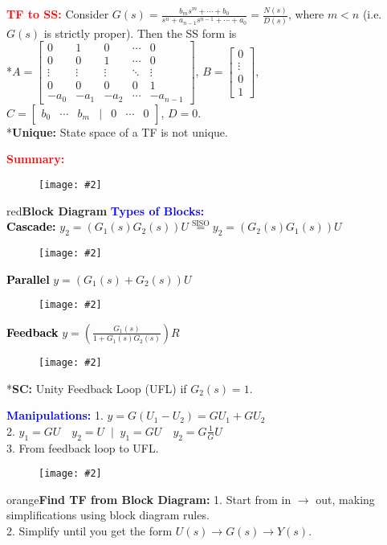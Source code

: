 \documentclass[5pt]{extarticle} %
\newcommand{\customFigure}[3][]{%
    \vspace{-1.5em}
    \begin{figure}[H]
        \centering
        \texttt{[image: \#2]}
    \end{figure}
    \vspace{-1.5em}
}
\begin{document}
\begin{paracol}{3}
{    \textcolor{red}{\textbf{TF to SS:}} Consider $G(s) = \frac{b_m s^m + \cdots + b_0}{s^n + a_{n-1} s^{n-1} + \cdots + a_0} = \frac{N(s)}{D(s)}$, where $m < n$ (i.e. $G(s)$ is strictly proper). Then the SS form is \\
    *$A = \begin{bmatrix} 0 & 1 & 0 & \cdots & 0 \\ 0 & 0 & 1 & \cdots & 0 \\ \vdots & \vdots & \vdots & \ddots & \vdots \\ 0 & 0 & 0 & 0 & 1 \\ -a_0 & -a_1 & -a_2 & \cdots & -a_{n-1} \end{bmatrix}$, $B = \begin{bmatrix} 0 \\ \vdots \\ 0 \\ 1 \end{bmatrix}$, \\
    $C = \begin{bmatrix} b_0 & \cdots & b_m & \mid & 0 & \cdots & 0 \end{bmatrix}$, $D = 0$. \\
    *\textbf{Unique:} State space of a TF is not unique. 

    \textcolor{red}{\textbf{Summary:}} \customFigure[0.25]{../Images/L8_0.png}

    \textcolor{red}{\textbf{Block Diagram}} \textcolor{blue}{\textbf{Types of Blocks:}} \\
    \textcolor{black}{\textbf{Cascade:}} $y_2 = (G_1(s) G_2(s)) U \overset{\text{SISO}}{=} y_2 = (G_2(s)G_1(s)) U$ \customFigure[0.25]{../Images/L9_0.png} \\
    \textcolor{black}{\textbf{Parallel}} $y = (G_1(s) + G_2(s)) U$ \customFigure[0.25]{../Images/L9_1.png} \\
    \textcolor{black}{\textbf{Feedback}} $y = \left(\frac{G_1(s)}{1 + G_1(s) G_2(s)}\right) R$ \customFigure[0.25]{../Images/L9_2.png} \\
    *\textbf{SC:} Unity Feedback Loop (UFL) if $G_2(s) = 1$.

    \textcolor{blue}{\textbf{Manipulations:}} 1. $y = G(U_1 - U_2) = GU_1 + GU_2$ \\
    2. $y_1 = G U \quad y_2 = U \; \mid \; y_1 = G U \quad y_2 = G \frac{1}{G} U$ \\ 
    3. From feedback loop to UFL. 
    \customFigure[0.3]{../Images/L9_3.png} 

    \textcolor{orange}{\textbf{Find TF from Block Diagram:}} 1. Start from in $\rightarrow$ out, making simplifications using block diagram rules. \\
    2. Simplify until you get the form $U(s) \rightarrow \boxed{G(s)} \rightarrow Y(s)$.

}
\end{paracol}
\end{document}
